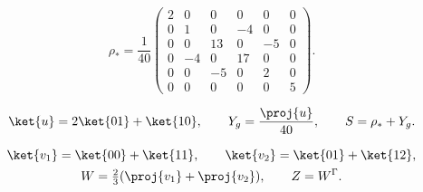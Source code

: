 
\begin{equation}
 \rho_*=\frac1{40}
 \begin{pmatrix}
 2&0&0&0&0&0\\
 0&1&0&-4&0&0\\
 0&0&13&0&-5&0\\
 0&-4&0&17&0&0\\
 0&0&-5&0&2&0\\
 0&0&0&0&0&5
 \end{pmatrix}.
 \label{eq:2x3-state-main}
\end{equation}

\begin{equation}
 \ket{u}=2\ket{01}+\ket{10},\qquad
 Y_g=\frac{\proj{u}}{40},\qquad S=\rho_*+Y_g.
 \label{eq:2x3-noise-main}
\end{equation}

\begin{equation}
 \begin{gathered}
 \ket{v_1}=\ket{00}+\ket{11},\qquad
 \ket{v_2}=\ket{01}+\ket{12},\\
 W=\tfrac23(\proj{v_1}+\proj{v_2}),\qquad Z=W^\Gamma .
 \end{gathered}
 \label{eq:2x3-witness-main}
\end{equation}
